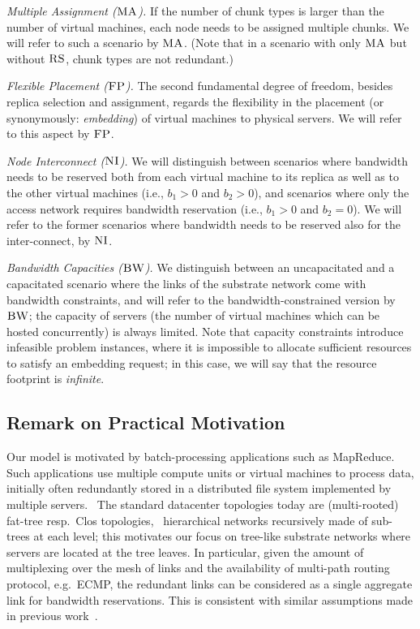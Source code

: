 \documentclass[9pt,twocolumn]{scrartcl}
\newcommand{\CC}{\textsc{NI}}
\newcommand{\FP}{\textsc{FP}}
\newcommand{\RS}{\textsc{RS}}
\newcommand{\BW}{\textsc{BW}}
\newcommand{\MA}{\textsc{MA}}
\newcommand{\CostTrans}{\ensuremath{b_1}}
\newcommand{\CostCom}{\ensuremath{b_2}}
\begin{document}
\emph{Multiple Assignment ($\MA$).}
If the number of chunk types is larger than the number of virtual machines,
each node needs to be assigned multiple chunks. We will refer to such a scenario by $\MA$.
(Note that in a scenario with only $\MA$ but without $\RS$, chunk types are not redundant.)

\emph{Flexible Placement ($\FP$).} The second fundamental degree of freedom, besides replica selection and assignment,
regards the flexibility in the placement (or synonymously: \emph{embedding}) of virtual machines to physical servers.
We will refer to this aspect by $\FP$.

\emph{Node Interconnect ($\CC$).} We will distinguish between scenarios where bandwidth needs to be reserved
both from each virtual machine to its replica as well as to the other virtual machines
(i.e., $\CostTrans>0$ and $\CostCom>0$), and
 scenarios where only the access network requires bandwidth reservation (i.e., $\CostTrans>0$ and $\CostCom=0$).
 We will refer to the former scenarios
where bandwidth needs to be reserved also for the inter-connect, by $\CC$.

\emph{Bandwidth Capacities ($\BW$).} We distinguish between an uncapacitated and a capacitated scenario where the links
of the substrate network come with bandwidth
constraints, and will refer to the bandwidth-constrained version by $\BW$; the capacity of servers
(the number of virtual machines which can be hosted concurrently) is always limited.
Note that capacity constraints introduce infeasible problem instances, where it is impossible to
allocate sufficient resources to satisfy an embedding request; in this case, we will say that the
resource footprint is \emph{infinite}.


\subsection{Remark on Practical Motivation}\label{ssec:practice}

Our model is motivated by batch-processing applications such as MapReduce.
Such applications use multiple compute units or virtual machines to
process data, initially often redundantly stored in a distributed file system implemented
by multiple servers.~\cite{mapreduce}
The standard datacenter topologies today are (multi-rooted) fat-tree resp.~Clos topologies,~\cite{vl2,fattree}
hierarchical networks  recursively made of sub-trees at each level; this motivates our 
focus on tree-like substrate networks where servers are located at the
tree leaves. In particular, given the amount of multiplexing over the mesh of links
and the availability of multi-path routing protocol, e.g.~ECMP, the redundant
links can be considered as a single aggregate link for bandwidth
reservations. This is consistent with similar assumptions made in
previous work~\cite{oktopus,proteus}.
\end{document}
